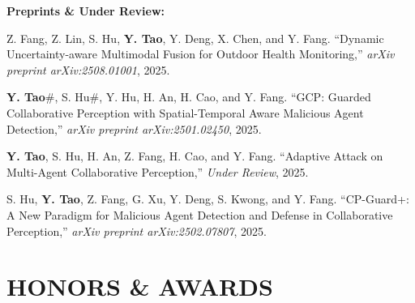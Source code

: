 \documentclass[letterpaper,11pt]{article}
\begin{document}
{{{{{{\vspace{2mm}
\large\textbf{Preprints \& Under Review:}

\begin{justify}
    \normalsize
    Z. Fang, Z. Lin, S. Hu, \textbf{Y. Tao}, Y. Deng, X. Chen, and Y. Fang. ``Dynamic Uncertainty-aware Multimodal Fusion for Outdoor Health Monitoring,'' \textit{arXiv preprint arXiv:2508.01001}, 2025.
\end{justify}

\begin{justify}
    \normalsize
    \textbf{Y. Tao}\#, S. Hu\#, Y. Hu, H. An, H. Cao, and Y. Fang. ``GCP: Guarded Collaborative Perception with Spatial-Temporal Aware Malicious Agent Detection,'' \textit{arXiv preprint arXiv:2501.02450}, 2025.
\end{justify}

\begin{justify}
    \normalsize
    \textbf{Y. Tao}, S. Hu, H. An, Z. Fang, H. Cao, and Y. Fang. ``Adaptive Attack on Multi-Agent Collaborative Perception,'' \textit{Under Review}, 2025.
\end{justify}

\begin{justify}
    \normalsize
    S. Hu, \textbf{Y. Tao}, Z. Fang, G. Xu, Y. Deng, S. Kwong, and Y. Fang. ``CP-Guard+: A New Paradigm for Malicious Agent Detection and Defense in Collaborative Perception,'' \textit{arXiv preprint arXiv:2502.07807}, 2025.
\end{justify}

\section{\textbf{HONORS \& AWARDS}}
\vspace{2mm}

}}}}}}
\end{document}
